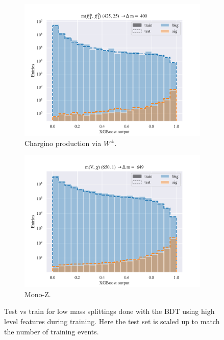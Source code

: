\begin{figure}[H]
    \begin{subfigure}[t!]{0.49\textwidth}
        \includegraphics[width = \textwidth]{Figures/WW/BDT/High_level/High/scaled_train_test_395330.pdf}
        \caption{Chargino production via $W^\pm$.}
        \label{fig:}
    \end{subfigure}
    \begin{subfigure}[t!]{0.49\textwidth}
        \includegraphics[width = \textwidth]{Figures/Mono_Z/ML/BDT/High_level/High/scaled_train_test_310617.pdf}
        \caption{Mono-Z.}
        \label{fig:}
    \end{subfigure}
    \caption{Test vs train for low mass splittings done with the BDT using high level features during training. Here the test set is scaled up to match the number of training events.}
    \label{fig:Non}
\end{figure}




